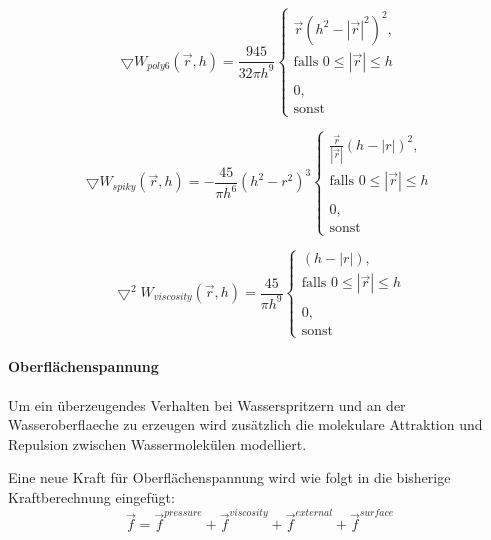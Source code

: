 \documentclass[a4paper]{paper}
\begin{document}
\begin{equation}
\label{gradient_poly6}
\bigtriangledown W_{poly6}(\vec{r},h) = \frac{945}{32 \pi h^9} 
\begin{cases}
\vec{r}(h^2-|\vec{r}|^2)^2, \\ \text{falls } 0 \leq |\vec{r}| \leq h  \\
\\
0, \\ \text{sonst}
\end{cases}
\end{equation}

\begin{equation}
\label{spiky}
\bigtriangledown W_{spiky}(\vec{r},h) = -\frac{45}{\pi h^6} (h^2-r^2)^3
\begin{cases}
\frac{\vec{r}}{|\vec{r}|}(h-|r|)^2, \\ \text{falls } 0 \leq |\vec{r}| \leq h\\

\\ 0, \\ \text{sonst}
\end{cases}
\end{equation}

\begin{equation}
\label{viscosity}
\bigtriangledown^2 W_{viscosity}(\vec{r},h) = \frac{45}{\pi h^9} 
\begin{cases}
(h-|r|),

\\ \text{falls } 0 \leq |\vec{r}| \leq h \\
\\
0, 
\\ \text{sonst}
\end{cases}
\end{equation}


\paragraph{Oberflächenspannung}
Um ein überzeugendes Verhalten bei Wasserspritzern und an der Wasseroberflaeche zu erzeugen wird zusätzlich die molekulare Attraktion und Repulsion zwischen Wassermolekülen modelliert.

Eine neue Kraft für Oberflächenspannung wird wie folgt in die bisherige Kraftberechnung eingefügt:
\begin{equation}
\label{force_with_surface}
\vec{f} = \vec{f}^{pressure} + \vec{f}^{viscosity} + \vec{f}^{external} + \vec{f}^{surface}
\end{equation}
\end{document}
